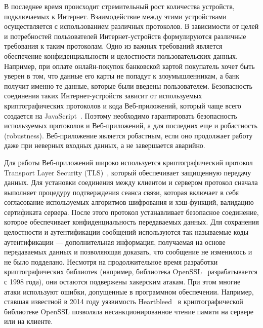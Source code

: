 \documentclass[12pt]{matmex-diploma}
\begin{document}
В последнее время происходит стремительный рост количества устройств, подключаемых к Интернет. Взаимодействие между этими устройствами осуществляется с использованием различных протоколов. В зависимости от целей и потребностей пользователей Интернет-устройств формулируются различные требования к таким протоколам. Одно из важных требований является обеспечение конфиденциальности и целостности пользовательских данных. Например, при оплате онлайн-покупок банковской картой покупатель хочет быть уверен в том, что данные его карты не попадут к злоумышленникам, а банк получит именно те данные, которые были введены пользователем. Безопасность соединения таких Интернет-устройств зависит от используемых криптографических протоколов и кода Веб-приложений, который чаще всего создается на JavaScript~\cite{js_semantics}. Поэтому необходимо гарантировать безопасность используемых протоколов и Веб-приложений, а для последних еще и робастность (robustness). Веб-приложение является робастным, если оно продолжает работу даже при неверных входных данных, а не завершается аварийно. 

Для работы Веб-приложений широко используется криптографический протокол Transport Layer Security (TLS)~\cite{tls}, который обеспечивает защищенную передачу данных. Для установки соединения между клиентом и сервером протокол сначала выполняет процедуру подтверждения сеанса связи, которая включает в себя согласование используемых алгоритмов шифрования и хэш-функций, валидацию сертификата сервера. После этого протокол устанавливает безопасное соединение, которое обеспечивает конфиденциальность передаваемых данных. Для сохранения целостности и аутентификации сообщений используются так называемые коды аутентификации --- дополнительная  информация, получаемая на основе передаваемых данных и позволяющая доказать, что сообщение не изменилось и не было подделано. Несмотря на продолжительное время разработки криптографических библиотек (например, библиотека OpenSSL~\cite{openssl} разрабатывается с 1998 года), они остаются подвержены хакерским атакам. При этом многие атаки используют ошибки, допущенные в программном обеспечении. Например, ставшая известной в  2014 году уязвимость Heartbleed~\cite{heartbleed} в криптографической библиотеке OpenSSL позволяла несанкционированное чтение памяти на сервере или на клиенте.
\end{document}
